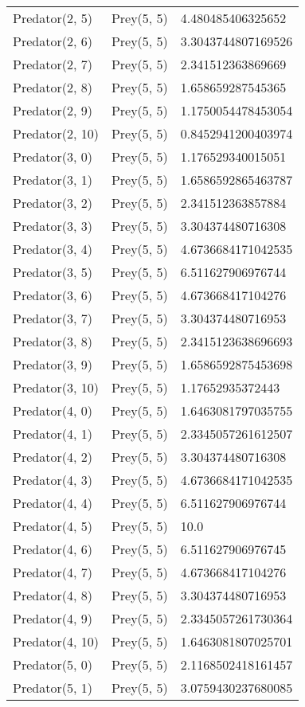 \begin{longtable}{| p{} | p{} | p{} |}
Predator(2, 5) & Prey(5, 5) &4.480485406325652\\
Predator(2, 6) & Prey(5, 5) &3.3043744807169526\\
Predator(2, 7) & Prey(5, 5) &2.341512363869669\\
Predator(2, 8) & Prey(5, 5) &1.658659287545365\\
Predator(2, 9) & Prey(5, 5) &1.1750054478453054\\
Predator(2, 10) & Prey(5, 5) &0.8452941200403974\\
Predator(3, 0) & Prey(5, 5) &1.176529340015051\\
Predator(3, 1) & Prey(5, 5) &1.6586592865463787\\
Predator(3, 2) & Prey(5, 5) &2.341512363857884\\
Predator(3, 3) & Prey(5, 5) &3.304374480716308\\
Predator(3, 4) & Prey(5, 5) &4.6736684171042535\\
Predator(3, 5) & Prey(5, 5) &6.511627906976744\\
Predator(3, 6) & Prey(5, 5) &4.673668417104276\\
Predator(3, 7) & Prey(5, 5) &3.304374480716953\\
Predator(3, 8) & Prey(5, 5) &2.3415123638696693\\
Predator(3, 9) & Prey(5, 5) &1.6586592875453698\\
Predator(3, 10) & Prey(5, 5) &1.17652935372443\\
Predator(4, 0) & Prey(5, 5) &1.6463081797035755\\
Predator(4, 1) & Prey(5, 5) &2.3345057261612507\\
Predator(4, 2) & Prey(5, 5) &3.304374480716308\\
Predator(4, 3) & Prey(5, 5) &4.6736684171042535\\
Predator(4, 4) & Prey(5, 5) &6.511627906976744\\
Predator(4, 5) & Prey(5, 5) &10.0\\
Predator(4, 6) & Prey(5, 5) &6.511627906976745\\
Predator(4, 7) & Prey(5, 5) &4.673668417104276\\
Predator(4, 8) & Prey(5, 5) &3.304374480716953\\
Predator(4, 9) & Prey(5, 5) &2.3345057261730364\\
Predator(4, 10) & Prey(5, 5) &1.6463081807025701\\
Predator(5, 0) & Prey(5, 5) &2.1168502418161457\\
Predator(5, 1) & Prey(5, 5) &3.0759430237680085\\

\end{longtable}
